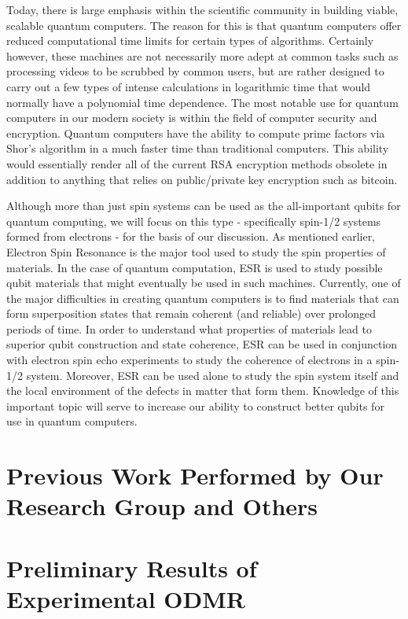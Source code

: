 \documentclass[oneside, astronomy, noacknowlegments]{BYUPhys}
\begin{document}
Today, there is large emphasis within the scientific community in building viable, scalable quantum computers. The reason for this is that quantum computers offer reduced computational time limits for certain types of algorithms. Certainly however, these machines are not necessarily more adept at common tasks such as processing videos to be scrubbed by common users, but are rather designed to carry out a few types of intense calculations in logarithmic time that would normally have a polynomial time dependence. The most notable use for quantum computers in our modern society is within the field of computer security and encryption. Quantum computers have the ability to compute prime factors via Shor’s algorithm in a much faster time than traditional computers. This ability would essentially render all of the current RSA encryption methods obsolete in addition to anything that relies on public/private key encryption such as bitcoin.

Although more than just spin systems can be used as the all-important qubits for quantum computing, we will focus on this type - specifically spin-1/2 systems formed from electrons - for the basis of our discussion. As mentioned earlier, Electron Spin Resonance is the major tool used to study the spin properties of materials. In the case of quantum computation, ESR is used to study possible qubit materials that might eventually be used in such machines. Currently, one of the major difficulties in creating quantum computers is to find materials that can form superposition states that remain coherent (and reliable) over prolonged periods of time. In order to understand what properties of materials lead to superior qubit construction and state coherence, ESR can be used in conjunction with electron spin echo experiments to study the coherence of electrons in a spin-1/2 system. Moreover, ESR can be used alone to study the spin system itself and the local environment of the defects in matter that form them. Knowledge of this important topic will serve to increase our ability to construct better qubits for use in quantum computers.

\section{Previous Work Performed by Our Research Group and Others}
\section{Preliminary Results of Experimental ODMR}
\end{document}

